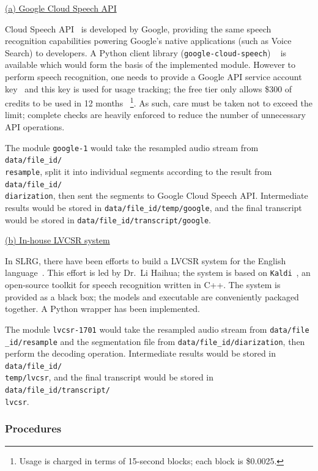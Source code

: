 \underline{(a) Google Cloud Speech API}

Cloud Speech API~\cite{gcs} is developed by Google, providing the same speech
recognition capabilities powering Google's native applications (such as Voice
Search) to developers. A Python client library (\texttt{google-cloud-speech})
~\cite{gh-gcs} is available which would form the basis of the implemented module.
However to perform speech recognition, one needs to provide a Google API service
account key~\cite{gcs-api-key} and this key is used for usage tracking; the free
tier only allows \$300 of credits to be used in 12 months~\cite{gcs-free}
\footnote{Usage is charged in terms of 15-second blocks; each block is \$0.0025.}.
As such, care must be taken not to exceed the limit; complete checks are heavily
enforced to reduce the number of unnecessary API operations.

The module \texttt{google-1} would take the resampled audio stream from
\texttt{data/file\_id/\\ resample}, split it into individual segments according
to the result from \texttt{data/file\_id/\\diarization}, then sent the segments
to Google Cloud Speech API\@. Intermediate results would be stored in
\texttt{data/file\_id/temp/google}, and the final transcript would be stored in
\texttt{data/file\_id/transcript/google}.

\underline{(b) In-house LVCSR system}

In SLRG, there have been efforts to build a LVCSR system for the English
language~\cite{slrg}. This effort is led by Dr.\ Li Haihua; the system is based
on \texttt{Kaldi}~\cite{kaldi}, an open-source toolkit for speech
recognition written in C++. The system is provided as a black box; the models
and executable are conveniently packaged together. A Python wrapper has been
implemented.

The module \texttt{lvcsr-1701} would take the resampled audio stream from
\texttt{data/file\\ \_id/resample} and the segmentation file from
\texttt{data/file\_id/diarization}, then perform the decoding operation.
Intermediate results would be stored in \texttt{data/file\_id/\\ temp/lvcsr},
and the final transcript would be stored in
\texttt{data/file\_id/transcript/\\lvcsr}.

\subsubsection{Procedures}

